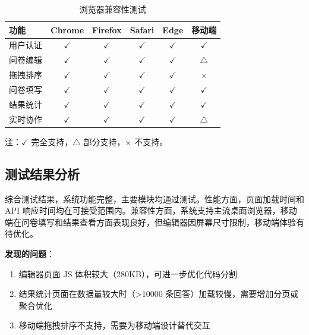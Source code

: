 \begin{table}[H]
\centering
\caption{浏览器兼容性测试}
\label{tab:compat-test}
\begin{tabular}{lccccc}
\toprule
\textbf{功能} & \textbf{Chrome} & \textbf{Firefox} & \textbf{Safari} & \textbf{Edge} & \textbf{移动端} \\
\midrule
用户认证 & $\checkmark$ & $\checkmark$ & $\checkmark$ & $\checkmark$ & $\checkmark$ \\
问卷编辑 & $\checkmark$ & $\checkmark$ & $\checkmark$ & $\checkmark$ & $\triangle$ \\
拖拽排序 & $\checkmark$ & $\checkmark$ & $\checkmark$ & $\checkmark$ & $\times$ \\
问卷填写 & $\checkmark$ & $\checkmark$ & $\checkmark$ & $\checkmark$ & $\checkmark$ \\
结果统计 & $\checkmark$ & $\checkmark$ & $\checkmark$ & $\checkmark$ & $\checkmark$ \\
实时协作 & $\checkmark$ & $\checkmark$ & $\checkmark$ & $\checkmark$ & $\triangle$ \\
\bottomrule
\end{tabular}
\end{table}

注：$\checkmark$ 完全支持，$\triangle$ 部分支持，$\times$ 不支持。

\subsection{测试结果分析}

综合测试结果，系统功能完整，主要模块均通过测试。性能方面，页面加载时间和 API 响应时间均在可接受范围内。兼容性方面，系统支持主流桌面浏览器，移动端在问卷填写和结果查看方面表现良好，但编辑器因屏幕尺寸限制，移动端体验有待优化。

\textbf{发现的问题}：

\begin{enumerate}[label=(\arabic*)]
  \item 编辑器页面 JS 体积较大（280KB），可进一步优化代码分割
  \item 结果统计页面在数据量较大时（>10000 条回答）加载较慢，需要增加分页或聚合优化
  \item 移动端拖拽排序不支持，需要为移动端设计替代交互
\end{enumerate}
